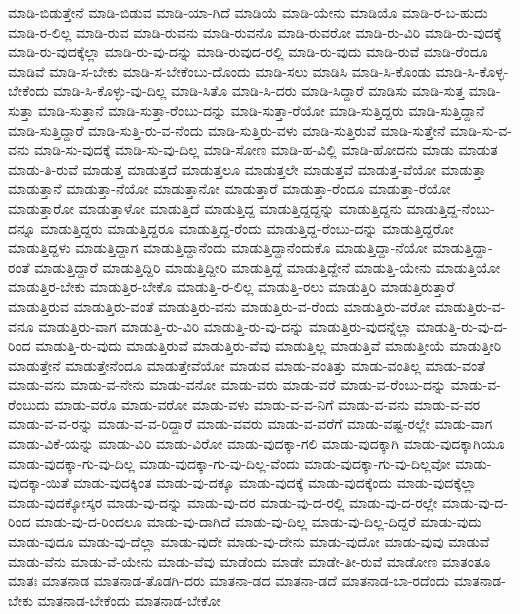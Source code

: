 {ಮಾಡಿ-ಬಿಡುತ್ತೇನೆ
ಮಾಡಿ-ಬಿಡುವ
ಮಾಡಿ-ಯಾ-ಗಿದೆ
ಮಾಡಿಯೆ
ಮಾಡಿ-ಯೇನು
ಮಾಡಿಯೊ
ಮಾಡಿ-ರ-ಬ-ಹುದು
ಮಾಡಿ-ರ-ಲಿಲ್ಲ
ಮಾಡಿ-ರುವ
ಮಾಡಿ-ರುವನು
ಮಾಡಿ-ರುವನೊ
ಮಾಡಿ-ರುವರೋ
ಮಾಡಿ-ರು-ವಿರಿ
ಮಾಡಿ-ರು-ವುದಕ್ಕೆ
ಮಾಡಿ-ರು-ವುದಕ್ಕೆಲ್ಲಾ
ಮಾಡಿ-ರು-ವು-ದನ್ನು
ಮಾಡಿ-ರುವುದ-ರಲ್ಲಿ
ಮಾಡಿ-ರು-ವುದು
ಮಾಡಿ-ರುವೆ
ಮಾಡಿ-ರೆಂದೂ
ಮಾಡಿವೆ
ಮಾಡಿ-ಸ-ಬೇಕು
ಮಾಡಿ-ಸ-ಬೇಕೆಂಬು-ದೊಂದು
ಮಾಡಿ-ಸಲು
ಮಾಡಿಸಿ
ಮಾಡಿ-ಸಿ-ಕೊಂಡು
ಮಾಡಿ-ಸಿ-ಕೊಳ್ಳ-ಬೇಕೆಂದು
ಮಾಡಿ-ಸಿ-ಕೊಳ್ಳು-ವು-ದಿಲ್ಲ
ಮಾಡಿ-ಸಿತೊ
ಮಾಡಿ-ಸಿ-ದರು
ಮಾಡಿ-ಸಿದ್ದಾರೆ
ಮಾಡಿಸು
ಮಾಡಿ-ಸುತ್ತ
ಮಾಡಿ-ಸುತ್ತಾ
ಮಾಡಿ-ಸುತ್ತಾನೆ
ಮಾಡಿ-ಸುತ್ತಾ-ರೆಂಬು-ದನ್ನು
ಮಾಡಿ-ಸುತ್ತಾ-ರೆಯೋ
ಮಾಡಿ-ಸುತ್ತಿದ್ದರು
ಮಾಡಿ-ಸುತ್ತಿದ್ದಾನೆ
ಮಾಡಿ-ಸುತ್ತಿದ್ದಾರೆ
ಮಾಡಿ-ಸುತ್ತಿ-ರು-ವ-ನೆಂದು
ಮಾಡಿ-ಸುತ್ತಿರು-ವಳು
ಮಾಡಿ-ಸುತ್ತಿರುವೆ
ಮಾಡಿ-ಸುತ್ತೇನೆ
ಮಾಡಿ-ಸು-ವ-ವನು
ಮಾಡಿ-ಸು-ವುದಕ್ಕೆ
ಮಾಡಿ-ಸು-ವು-ದಿಲ್ಲ
ಮಾಡಿ-ಸೋಣ
ಮಾಡಿ-ಹ-ವಿಲ್ಲಿ
ಮಾಡಿ-ಹೋದನು
ಮಾಡು
ಮಾಡುತ
ಮಾಡು-ತಿ-ರುವೆ
ಮಾಡುತ್ತ
ಮಾಡುತ್ತದೆ
ಮಾಡುತ್ತಲೂ
ಮಾಡುತ್ತಲೇ
ಮಾಡುತ್ತವೆ
ಮಾಡುತ್ತ-ವೆಯೋ
ಮಾಡುತ್ತಾ
ಮಾಡುತ್ತಾನೆ
ಮಾಡುತ್ತಾ-ನೆಯೋ
ಮಾಡುತ್ತಾನೋ
ಮಾಡುತ್ತಾರೆ
ಮಾಡುತ್ತಾ-ರೆಂದೂ
ಮಾಡುತ್ತಾ-ರೆಯೋ
ಮಾಡುತ್ತಾರೋ
ಮಾಡುತ್ತಾಳೋ
ಮಾಡುತ್ತಿದೆ
ಮಾಡುತ್ತಿದ್ದ
ಮಾಡುತ್ತಿದ್ದದ್ದನ್ನು
ಮಾಡುತ್ತಿದ್ದನು
ಮಾಡುತ್ತಿದ್ದ-ನೆಂಬು-ದನ್ನೂ
ಮಾಡುತ್ತಿದ್ದರು
ಮಾಡುತ್ತಿದ್ದರೂ
ಮಾಡುತ್ತಿದ್ದ-ರೆಂದು
ಮಾಡುತ್ತಿದ್ದ-ರೆಂಬು-ದನ್ನು
ಮಾಡುತ್ತಿದ್ದರೋ
ಮಾಡುತ್ತಿದ್ದಳು
ಮಾಡುತ್ತಿದ್ದಾಗ
ಮಾಡುತ್ತಿದ್ದಾನೆಂದು
ಮಾಡುತ್ತಿದ್ದಾನೆಂದುಕೊ
ಮಾಡುತ್ತಿದ್ದಾ-ನೆಯೋ
ಮಾಡುತ್ತಿದ್ದಾ-ರಂತೆ
ಮಾಡುತ್ತಿದ್ದಾರೆ
ಮಾಡುತ್ತಿದ್ದಿರಿ
ಮಾಡುತ್ತಿದ್ದೀರಿ
ಮಾಡುತ್ತಿದ್ದೆ
ಮಾಡುತ್ತಿದ್ದೇನೆ
ಮಾಡುತ್ತಿ-ಯೇನು
ಮಾಡುತ್ತಿಯೋ
ಮಾಡುತ್ತಿರ-ಬೇಕು
ಮಾಡುತ್ತಿರ-ಬೇಕೊ
ಮಾಡುತ್ತಿ-ರ-ಲಿಲ್ಲ
ಮಾಡುತ್ತಿ-ರಲು
ಮಾಡುತ್ತಿರಿ
ಮಾಡುತ್ತಿರುತ್ತಾರೆ
ಮಾಡುತ್ತಿರುವ
ಮಾಡುತ್ತಿರು-ವಂತೆ
ಮಾಡುತ್ತಿರು-ವನು
ಮಾಡುತ್ತಿರು-ವ-ರೆಂದು
ಮಾಡುತ್ತಿರು-ವರೋ
ಮಾಡುತ್ತಿರು-ವ-ವನೂ
ಮಾಡುತ್ತಿರು-ವಾಗ
ಮಾಡುತ್ತಿ-ರು-ವಿರಿ
ಮಾಡುತ್ತಿ-ರು-ವು-ದನ್ನು
ಮಾಡುತ್ತಿರು-ವುದನ್ನೆಲ್ಲಾ
ಮಾಡುತ್ತಿ-ರು-ವು-ದ-ರಿಂದ
ಮಾಡುತ್ತಿ-ರು-ವುದು
ಮಾಡುತ್ತಿರುವೆ
ಮಾಡುತ್ತಿರು-ವೆವು
ಮಾಡುತ್ತಿಲ್ಲ
ಮಾಡುತ್ತಿವೆ
ಮಾಡುತ್ತೀಯೆ
ಮಾಡುತ್ತೀರಿ
ಮಾಡುತ್ತೇನೆ
ಮಾಡುತ್ತೇನೆಂದೂ
ಮಾಡುತ್ತೇವೆಯೋ
ಮಾಡುವ
ಮಾಡು-ವಂತಿತ್ತು
ಮಾಡು-ವಂತಿಲ್ಲ
ಮಾಡು-ವಂತೆ
ಮಾಡು-ವನು
ಮಾಡು-ವ-ನೇನು
ಮಾಡು-ವನೋ
ಮಾಡು-ವರು
ಮಾಡು-ವರೆ
ಮಾಡು-ವ-ರೆಂಬು-ದನ್ನು
ಮಾಡು-ವ-ರೆಂಬುದು
ಮಾಡು-ವರೊ
ಮಾಡು-ವರೋ
ಮಾಡು-ವಳು
ಮಾಡು-ವ-ವ-ನಿಗೆ
ಮಾಡು-ವ-ವನು
ಮಾಡು-ವ-ವರ
ಮಾಡು-ವ-ವ-ರನ್ನು
ಮಾಡು-ವ-ವ-ರಿದ್ದಾರೆ
ಮಾಡು-ವವರು
ಮಾಡು-ವ-ವರೆಗೆ
ಮಾಡು-ವಷ್ಟ-ರಲ್ಲೇ
ಮಾಡು-ವಾಗ
ಮಾಡು-ವಿಕೆ-ಯನ್ನು
ಮಾಡು-ವಿರಿ
ಮಾಡು-ವಿರೋ
ಮಾಡು-ವುದಕ್ಕಾ-ಗಲಿ
ಮಾಡು-ವುದಕ್ಕಾಗಿ
ಮಾಡು-ವುದಕ್ಕಾಗಿಯೂ
ಮಾಡು-ವುದಕ್ಕಾ-ಗು-ವು-ದಿಲ್ಲ
ಮಾಡು-ವುದಕ್ಕಾ-ಗು-ವು-ದಿಲ್ಲ-ವೆಂದು
ಮಾಡು-ವುದಕ್ಕಾ-ಗು-ವು-ದಿಲ್ಲವೋ
ಮಾಡು-ವುದಕ್ಕಾ-ಯಿತೆ
ಮಾಡು-ವುದಕ್ಕಿಂತ
ಮಾಡು-ವು-ದಕ್ಕೂ
ಮಾಡು-ವುದಕ್ಕೆ
ಮಾಡು-ವುದಕ್ಕೆಂದು
ಮಾಡು-ವುದಕ್ಕೆಲ್ಲಾ
ಮಾಡು-ವುದಕ್ಕೋಸ್ಕರ
ಮಾಡು-ವು-ದನ್ನು
ಮಾಡು-ವು-ದರ
ಮಾಡು-ವು-ದ-ರಲ್ಲಿ
ಮಾಡು-ವು-ದ-ರಲ್ಲೇ
ಮಾಡು-ವು-ದ-ರಿಂದ
ಮಾಡು-ವು-ದ-ರಿಂದಲೂ
ಮಾಡು-ವು-ದಾಗಿದೆ
ಮಾಡು-ವು-ದಿಲ್ಲ
ಮಾಡು-ವು-ದಿಲ್ಲ-ದಿದ್ದರೆ
ಮಾಡು-ವುದು
ಮಾಡು-ವುದೂ
ಮಾಡು-ವು-ದೆಲ್ಲಾ
ಮಾಡು-ವುದೇ
ಮಾಡು-ವು-ದೇನು
ಮಾಡು-ವುದೋ
ಮಾಡು-ವುವು
ಮಾಡುವೆ
ಮಾಡು-ವೆನು
ಮಾಡು-ವೆ-ಯೇನು
ಮಾಡು-ವೆವು
ಮಾಡೆಂದು
ಮಾಡೇ
ಮಾಡೇ-ತೀ-ರುವೆ
ಮಾಡೋಣ
ಮಾತಂತೂ
ಮಾತಃ
ಮಾತನಾಡ
ಮಾತನಾಡ-ತೊಡಗಿ-ದರು
ಮಾತನಾ-ಡದ
ಮಾತನಾ-ಡದೆ
ಮಾತನಾಡ-ಬಾ-ರದೆಂದು
ಮಾತನಾಡ-ಬೇಕು
ಮಾತನಾಡ-ಬೇಕೆಂದು
ಮಾತನಾಡ-ಬೇಕೋ
}
